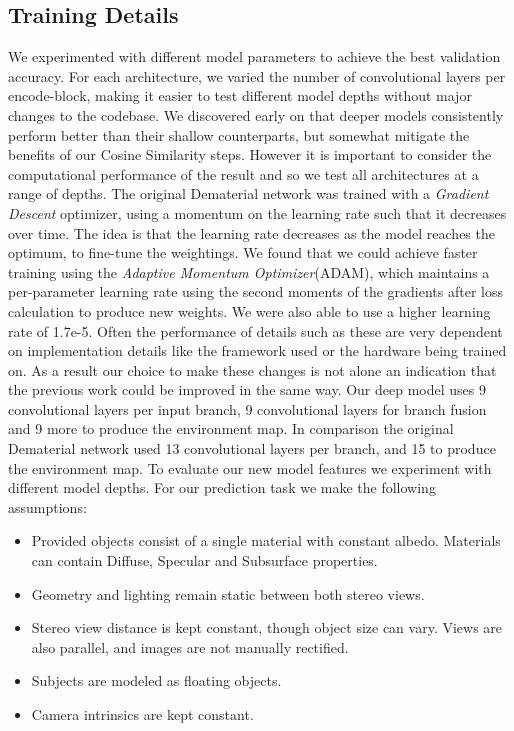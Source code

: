 \documentclass[ %
                    author={Gavin Parker},
                supervisor={Dr. Neill Campbell},
                    degree={MEng},
                     title={Deep Learning for Illumination Estimation from Stereo Images},
                  subtitle={},
                      type={Research},
                      year={2018} ]{dissertation}
\begin{document}
\subsection{Training Details}
 We experimented with different model parameters to achieve the best validation accuracy. For each architecture, we varied the number of convolutional layers per encode-block, making it easier to test different model depths without major changes to the codebase. We discovered early on that deeper models consistently perform better than their shallow counterparts, but somewhat mitigate the benefits of our Cosine Similarity steps. However it is important to consider the computational performance of the result and so we test all architectures at a range of depths.
\newline
The original Dematerial network was trained with a \textit{Gradient Descent} optimizer, using a momentum on the learning rate such that it decreases over time. The idea is that the learning rate decreases as the model reaches the optimum, to fine-tune the weightings. We found that we could achieve faster training using the \textit{Adaptive Momentum Optimizer}(ADAM), which maintains a per-parameter learning rate using the second moments of the gradients after loss calculation to produce new weights. We were also able to use a higher learning rate of 1.7e-5. Often the performance of details such as these are very dependent on implementation details like the framework used or the hardware being trained on. As a result our choice to make these changes is not alone an indication that the previous work could be improved in the same way.
\newline
Our deep model uses 9 convolutional layers per input branch, 9 convolutional layers for branch fusion and 9 more to produce the environment map. In comparison the original Dematerial network used 13 convolutional layers per branch, and 15 to produce the environment map. To evaluate our new model features we experiment with different model depths.
\newline
For our prediction task we make the following assumptions:
\begin{itemize}
\item Provided objects consist of a single material with constant albedo. Materials can contain Diffuse, Specular and Subsurface properties.
\item Geometry and lighting remain static between both stereo views.
\item Stereo view distance is kept constant, though object size can vary. Views are also parallel, and images are not manually rectified.
\item Subjects are modeled as floating objects.
\item Camera intrinsics are kept constant.
\end{itemize}
\end{document}
